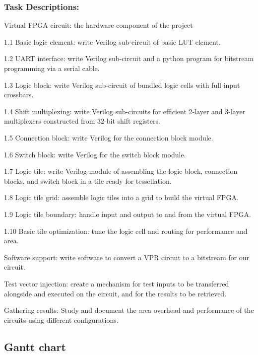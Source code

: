 \subsubsection*{Task Descriptions:}
\begin{enumeration}
	\item Virtual FPGA circuit: the hardware component of the project \
	\begin{itemlist}
		\item[1.1] Basic logic element: write Verilog sub-circuit of basic LUT element.
		\item[1.2] UART interface: write Verilog sub-circuit and a python program for bitstream programming via a serial cable.
		\item[1.3] Logic block: write Verilog sub-circuit of bundled logic cells with full input crossbars.
		\item[1.4] Shift multiplexing: write Verilog sub-circuits for efficient 2-layer and 3-layer multiplexers constructed from 32-bit shift registers.
		\item[1.5] Connection block: write Verilog for the connection block module.
		\item[1.6] Switch block: write Verilog for the switch block module.
		\item[1.7] Logic tile: write Verilog module of assembling the logic block, connection blocks, and switch block in a tile ready for tessellation.
		\item[1.8] Logic tile grid: assemble logic tiles into a grid to build the virtual FPGA.
		\item[1.9] Logic tile boundary: handle input and output to and from the virtual FPGA.
		\item[1.10] Basic tile optimization: tune the logic cell and routing for performance and area.
	\end{itemlist}
	\item Software support: write software to convert a VPR circuit to a bitstream for our circuit.
	\item Test vector injection: create a mechanism for test inputs to be transferred alongside and executed on the circuit, and for the results to be retrieved.
	\item Gathering results: Study and document the area overhead and performance of the circuits using different configurations.
\end{enumeration}


\subsection{Gantt chart} %

